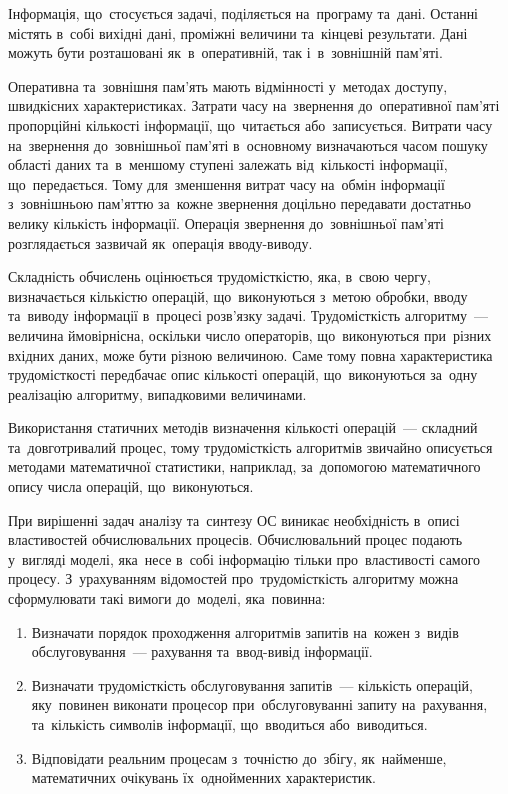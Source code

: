 \documentclass[
	a4paper,
	oneside,
	BCOR = 10mm,
	DIV = 12,
	12pt,
	headings = normal,
]{scrartcl}
\begin{document}
		Інформація, що~стосується задачі, поділяється на~програму та~дані. Останні містять в~собі вихідні дані, проміжні величини та~кінцеві результати. Дані можуть бути розташовані як~в~оперативній, так і~в~зовнішній пам'\-я\-ті.

		Оперативна та~зовнішня пам'\-ять мають відмінності у~методах доступу, швидкісних характеристиках. Затрати часу на~звернення до~оперативної пам'\-я\-ті пропорційні кількості інформації, що~читається або~записується. Витрати часу на~звернення до~зовнішньої пам'\-я\-ті в~основному визначаються часом пошуку області даних та~в~меншому ступені залежать від~кількості інформації, що~передається. Тому для~зменшення витрат часу на~обмін інформації з~зовнішньою пам'\-я\-ттю за~кожне звернення доцільно передавати достатньо велику кількість інформації. Операція звернення до~зовнішньої пам'\-я\-ті розглядається зазвичай як~операція вводу-виводу.

		Складність обчислень оцінюється трудомісткістю, яка, в~свою чергу, визначається кількістю операцій, що~виконуються з~метою обробки, вводу та~виводу інформації в~процесі роз\-в'я\-зку задачі. Трудомісткість алгоритму~— величина ймовірнісна, оскільки число операторів, що~виконуються при~різних вхідних даних, може бути різною величиною. Саме тому повна характеристика трудомісткості передбачає опис кількості операцій, що~виконуються за~одну реалізацію алгоритму, випадковими величинами.

		Використання статичних методів визначення кількості операцій~— складний та~довготривалий процес, тому трудомісткість алгоритмів звичайно описується методами математичної статистики, наприклад, за~допомогою математичного опису числа операцій, що~виконуються.


		При вирішенні задач аналізу та~синтезу ОС виникає необхідність в~описі властивостей обчислювальних процесів. Обчислювальний процес подають у~вигляді моделі, яка~несе в~собі інформацію тільки про~властивості самого процесу. З~урахуванням відомостей про~трудомісткість алгоритму можна сформулювати такі вимоги до~моделі, яка~повинна:
		\begin{enumerate}[itemsep = 1\baselineskip]
			\item Визначати порядок проходження алгоритмів запитів на~кожен з~видів обслуговування~— рахування та~ввод-вивід інформації.
			\item Визначати трудомісткість обслуговування запитів~— кількість операцій, яку~повинен виконати процесор при~обслуговуванні запиту на~рахування, та~кількість символів інформації, що~вводиться або~виводиться. 
			\item Відповідати реальним процесам з~точністю до~збігу, як~найменше, математичних очікувань їх~однойменних характеристик. 
		\end{enumerate}
\end{document}
